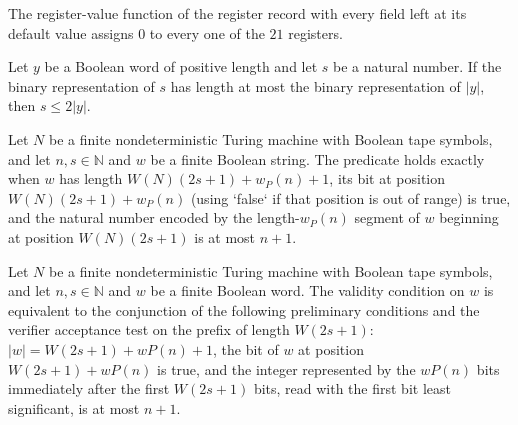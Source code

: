 \begin{lemma}
\label{Complexity.Codec.val_empty}
\leanok
{}
The register-value function of the register record with every field left at its default
value assigns $0$ to every one of the $21$ registers.
\end{lemma}

\begin{lemma}
\label{Complexity.Codec.s_le_of_width}
\leanok
{}
Let $y$ be a Boolean word of positive length and let $s$ be a natural number. If the
binary representation of $s$ has length at most the binary representation of $|y|$, then
$s\le 2|y|$.
\end{lemma}

\begin{definition}
\label{Complexity.Codec.PreChk}
\leanok
{}
Let $N$ be a finite nondeterministic Turing machine with Boolean tape symbols, and let
$n,s\in\mathbb{N}$ and $w$ be a finite Boolean string. The predicate holds exactly when
$w$ has length $W(N)(2s+1)+w_P(n)+1$, its bit at position $W(N)(2s+1)+w_P(n)$ (using
`false` if that position is out of range) is true, and the natural number encoded by the
length-$w_P(n)$ segment of $w$ beginning at position $W(N)(2s+1)$ is at most $n+1$.
\end{definition}

\begin{lemma}
\label{Complexity.Codec.validChk_iff_pre}
\leanok
{}
Let $N$ be a finite nondeterministic Turing machine with Boolean tape symbols, and let
$n,s\in\mathbb N$ and $w$ be a finite Boolean word. The validity condition on $w$ is
equivalent to the conjunction of the following preliminary conditions and the verifier
acceptance test on the prefix of length $W(2s+1)$: $|w|=W(2s+1)+wP(n)+1$, the bit of $w$
at position $W(2s+1)+wP(n)$ is true, and the integer represented by the $wP(n)$ bits
immediately after the first $W(2s+1)$ bits, read with the first bit least significant,
is at most $n+1$.
\end{lemma}

